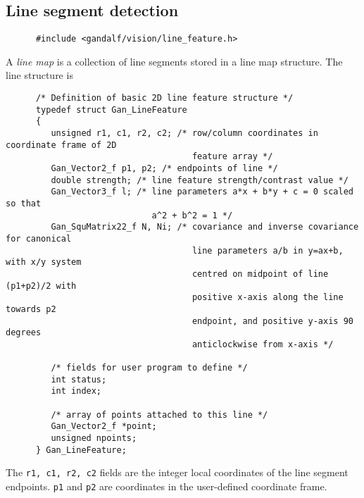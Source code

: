 \subsection{Line segment detection}
\begin{verbatim}
      #include <gandalf/vision/line_feature.h>
\end{verbatim}
A {\em line map} is a collection of line segments stored in
a line map structure. The line structure is
\begin{verbatim}
      /* Definition of basic 2D line feature structure */
      typedef struct Gan_LineFeature
      {
         unsigned r1, c1, r2, c2; /* row/column coordinates in coordinate frame of 2D
                                     feature array */
         Gan_Vector2_f p1, p2; /* endpoints of line */
         double strength; /* line feature strength/contrast value */
         Gan_Vector3_f l; /* line parameters a*x + b*y + c = 0 scaled so that
                             a^2 + b^2 = 1 */
         Gan_SquMatrix22_f N, Ni; /* covariance and inverse covariance for canonical
                                     line parameters a/b in y=ax+b, with x/y system
                                     centred on midpoint of line (p1+p2)/2 with
                                     positive x-axis along the line towards p2
                                     endpoint, and positive y-axis 90 degrees
                                     anticlockwise from x-axis */
      
         /* fields for user program to define */
         int status;
         int index;

         /* array of points attached to this line */
         Gan_Vector2_f *point;
         unsigned npoints;
      } Gan_LineFeature;
\end{verbatim}
The {\tt r1, c1, r2, c2} fields are the integer local coordinates of the line
segment endpoints. {\tt p1} and {\tt p2} are coordinates in the user-defined
coordinate frame.

